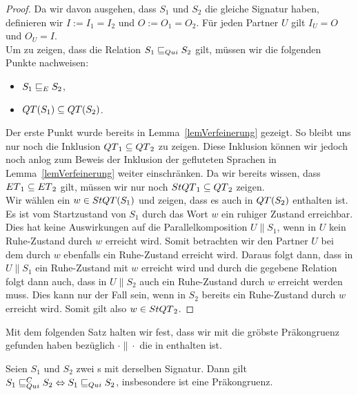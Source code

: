 \begin{proof}
  Da wir davon ausgehen, dass $S_1$ und $S_2$ die gleiche Signatur haben,
  definieren wir $I:=I_1=I_2$ und $O:=O_1=O_2$. Für jeden Partner $U$ gilt
  $I_U=O$ und $O_U=I$.\\
  Um zu zeigen, dass die Relation $S_1\sqsubseteq _{Qui} S_2$ gilt, müssen wir die
  folgenden Punkte nachweisen:
  \begin{itemize}
    \item $S_1\sqsubseteq _E S_2$,
    \item $QT{}(S_1)\subseteq QT{}(S_2)$.
  \end{itemize}
  Der erste Punkt wurde bereits in Lemma~\ref{lemVerfeinerung}
  gezeigt. So bleibt uns nur noch die Inklusion $QT{}_1\subseteq QT{}_2$ zu
  zeigen. Diese Inklusion können wir jedoch noch anlog zum Beweis der Inklusion
  der gefluteten Sprachen in Lemma~\ref{lemVerfeinerung} weiter einschränken.
  Da wir bereits wissen, dass $ET{}_1\subseteq ET{}_2$ gilt, müssen wir nur
  noch $StQT{}_1\subseteq QT{}_2$ zeigen.\\
  Wir wählen ein $w\in StQT{}(S_1)$ und zeigen, dass es auch in $QT{}(S_2)$
  enthalten ist.\\
  Es ist vom Startzustand von $S_1$ durch das Wort $w$ ein ruhiger Zustand
  erreichbar. Dies hat keine Auswirkungen auf die Parallelkomposition $U\|S_1$,
  wenn in $U$ kein Ruhe-Zustand durch $w$ erreicht wird. Somit betrachten wir
  den Partner $U$ bei dem durch $w$ ebenfalls ein Ruhe-Zustand erreicht wird.
  Daraus folgt dann, dass in $U\|S_1$ ein Ruhe-Zustand mit $w$ erreicht wird
  und durch die gegebene Relation folgt dann auch, dass in $U\|S_2$ auch ein
  Ruhe-Zustand durch $w$ erreicht werden muss. Dies kann nur der Fall sein,
  wenn in $S_2$ bereits ein Ruhe-Zustand durch $w$ erreicht wird. Somit gilt
  also $w\in StQT{}_2$.
\end{proof}

Mit dem folgenden Satz halten wir fest, dass wir mit \QRel{} die gröbste
Präkongruenz gefunden haben bezüglich $\cdot\|\cdot$ die in \QBRel{} enthalten
ist.


\begin{satz}
  \label{satzQuiFullAbst}
  Seien $S_1$ und $S_2$ zwei \EIO{}s mit derselben Signatur. Dann gilt
  $S_1\sqsubseteq _{Qui}^C S_2\Leftrightarrow S_1\sqsubseteq _{Qui} S_2$, insbesondere ist \QRel{} eine
  Präkongruenz.
\end{satz}

